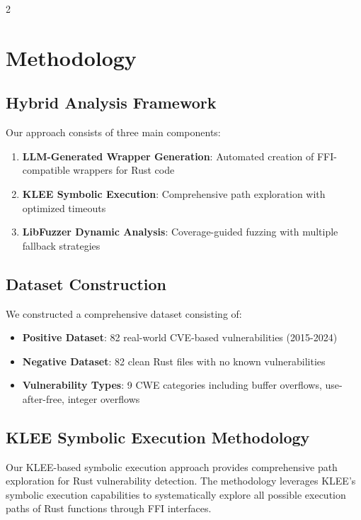 \documentclass[12pt,a4paper]{article}
\begin{document}
\begin{multicols}{2}
\section{Methodology}

\subsection{Hybrid Analysis Framework}

Our approach consists of three main components:

\begin{enumerate}
    \item \textbf{LLM-Generated Wrapper Generation}: Automated creation of FFI-compatible wrappers for Rust code
    \item \textbf{KLEE Symbolic Execution}: Comprehensive path exploration with optimized timeouts
    \item \textbf{LibFuzzer Dynamic Analysis}: Coverage-guided fuzzing with multiple fallback strategies
\end{enumerate}

\subsection{Dataset Construction}

We constructed a comprehensive dataset consisting of:

\begin{itemize}
    \item \textbf{Positive Dataset}: 82 real-world CVE-based vulnerabilities (2015-2024)
    \item \textbf{Negative Dataset}: 82 clean Rust files with no known vulnerabilities
    \item \textbf{Vulnerability Types}: 9 CWE categories including buffer overflows, use-after-free, integer overflows
\end{itemize}

\subsection{KLEE Symbolic Execution Methodology}

Our KLEE-based symbolic execution approach provides comprehensive path exploration for Rust vulnerability detection. The methodology leverages KLEE's symbolic execution capabilities to systematically explore all possible execution paths of Rust functions through FFI interfaces.


\end{multicols}
\end{document}
